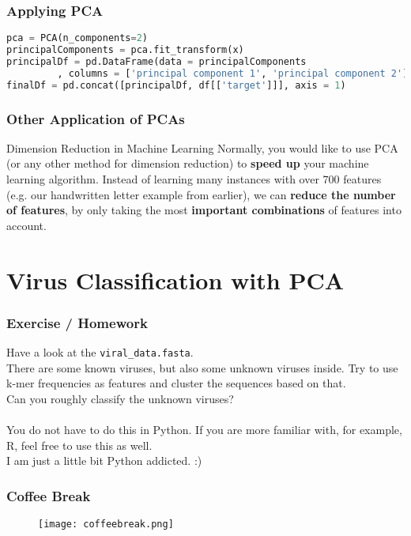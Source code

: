 \begin{frame}[c, fragile]\frametitle{Applying PCA}
  \begin{lstlisting}[language=Python, showstringspaces=false]    
pca = PCA(n_components=2)
principalComponents = pca.fit_transform(x)
principalDf = pd.DataFrame(data = principalComponents
         , columns = ['principal component 1', 'principal component 2'])
finalDf = pd.concat([principalDf, df[['target']]], axis = 1)
  \end{lstlisting}
\end{frame}

\begin{frame}[c]\frametitle{Other Application of PCAs}
  \begin{block}{Dimension Reduction in Machine Learning}
    Normally, you would like to use PCA (or any other method for dimension reduction) to \textbf{speed up}
    your machine learning algorithm.
    Instead of learning many instances with over 700 features (e.g. our handwritten letter example from earlier),
    we can \textbf{reduce the number of features}, by only taking the most \textbf{important combinations} of features into account.
  \end{block}
\end{frame}

\section[Classification]{Virus Classification with PCA}

\begin{frame}[c]\frametitle{Exercise / Homework}
  \begin{block}{}
  Have a look at the \texttt{viral\_data.fasta}.\\
  There are some known viruses, but also some unknown viruses inside. Try to use k-mer frequencies as features 
  and cluster the sequences based on that.\\Can you roughly classify the unknown viruses?\\ \ \\
  {\tiny You do not have to do this in Python. If you are more familiar with, for example, R, feel free to use this as well.\\
  I am just a little bit Python addicted. :)}
  \end{block}
\end{frame}


\beginbackup

\begin{frame}[c]\frametitle{Coffee Break}
  \begin{figure}[htbp]
    \centering
    \texttt{[image: coffeebreak.png]}
  \end{figure}
\end{frame}

\backupend

